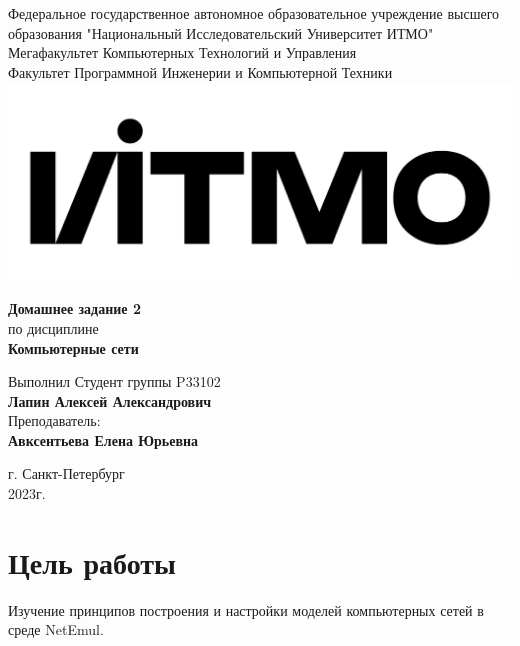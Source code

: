 \documentclass[12pt,onecolumn]{article}
\begin{document}
\setcounter{tocdepth}{4}
\begin{center}
    Федеральное государственное автономное образовательное учреждение высшего образования "Национальный Исследовательский Университет ИТМО"\\ 
    Мегафакультет Компьютерных Технологий и Управления\\
    Факультет Программной Инженерии и Компьютерной Техники \\
    \includegraphics[scale=0.3]{image/itmo.jpg} %
\end{center}
\vspace{1cm}


\begin{center}
    \textbf{Домашнее задание 2}\\
    по дисциплине\\
    \textbf{Компьютерные сети}
\end{center}

\vspace{2cm}

\begin{flushright}
  Выполнил Студент  группы P33102\\
  \textbf{Лапин Алексей Александрович}\\
  Преподаватель: \\
  \textbf{Авксентьева Елена Юрьевна}\\
\end{flushright}

\vspace{6cm}
\begin{center}
    г. Санкт-Петербург\\
    2023г.
\end{center}

\newpage
\tableofcontents
\newpage

\section{Цель работы}
Изучение принципов построения и настройки моделей компьютерных сетей в среде NetEmul.
\end{document}
